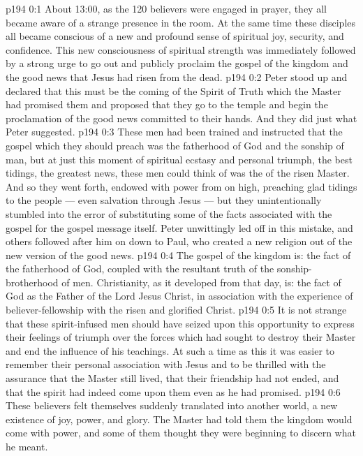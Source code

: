 \author{Midwayer Commission}
\vs p194 0:1 About 13:00, as the 120 believers were engaged in prayer, they all became aware of a strange presence in the room. At the same time these disciples all became conscious of a new and profound sense of spiritual joy, security, and confidence. This new consciousness of spiritual strength was immediately followed by a strong urge to go out and publicly proclaim the gospel of the kingdom and the good news that Jesus had risen from the dead.
\vs p194 0:2 Peter stood up and declared that this must be the coming of the Spirit of Truth which the Master had promised them and proposed that they go to the temple and begin the proclamation of the good news committed to their hands. And they did just what Peter suggested.
\vs p194 0:3 \pc These men had been trained and instructed that the gospel which they should preach was the fatherhood of God and the sonship of man, but at just this moment of spiritual ecstasy and personal triumph, the best tidings, the greatest news, these men could think of was the  of the risen Master. And so they went forth, endowed with power from on high, preaching glad tidings to the people --- even salvation through Jesus --- but they unintentionally stumbled into the error of substituting some of the facts associated with the gospel for the gospel message itself. Peter unwittingly led off in this mistake, and others followed after him on down to Paul, who created a new religion out of the new version of the good news.
\vs p194 0:4 The gospel of the kingdom is: the fact of the fatherhood of God, coupled with the resultant truth of the sonship\hyp{}brotherhood of men. Christianity, as it developed from that day, is: the fact of God as the Father of the Lord Jesus Christ, in association with the experience of believer\hyp{}fellowship with the risen and glorified Christ.
\vs p194 0:5 It is not strange that these spirit\hyp{}infused men should have seized upon this opportunity to express their feelings of triumph over the forces which had sought to destroy their Master and end the influence of his teachings. At such a time as this it was easier to remember their personal association with Jesus and to be thrilled with the assurance that the Master still lived, that their friendship had not ended, and that the spirit had indeed come upon them even as he had promised.
\vs p194 0:6 These believers felt themselves suddenly translated into another world, a new existence of joy, power, and glory. The Master had told them the kingdom would come with power, and some of them thought they were beginning to discern what he meant.
